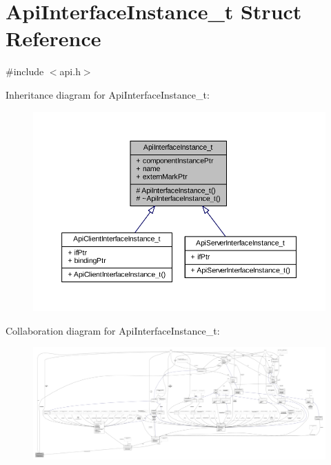\hypertarget{struct_api_interface_instance__t}{}\section{Api\+Interface\+Instance\+\_\+t Struct Reference}
\label{struct_api_interface_instance__t}


{\ttfamily \#include $<$api.\+h$>$}



Inheritance diagram for Api\+Interface\+Instance\+\_\+t\+:
\nopagebreak
\begin{figure}[H]
\begin{center}
\leavevmode
\includegraphics[width=350pt]{struct_api_interface_instance__t__inherit__graph}
\end{center}
\end{figure}


Collaboration diagram for Api\+Interface\+Instance\+\_\+t\+:
\nopagebreak
\begin{figure}[H]
\begin{center}
\leavevmode
\includegraphics[width=350pt]{struct_api_interface_instance__t__coll__graph}
\end{center}
\end{figure}
